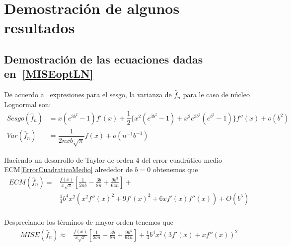\section{Demostración de algunos resultados}

\subsection{Demostración de las ecuaciones dadas en~\eqref{MISEoptLN}}
\begin{dem}
	De acuerdo a~\cite{Libnegue2013} expresiones para el sesgo, la varianza de $\widehat{f}_n$ para le caso de núcleo Lognormal son:
	\begin{align}
	Sesgo(\widehat{f}_n)&=x(e^{3 b^2}-1) f'(x)+\dfrac{1}{2}\{x^2(e^{3 b^2}-1)+x^2 e^{3b^2}(e^{b^2}-1)\}f''(x)+o(b^2)\\
	Var(\widehat{f}_n)&=\dfrac{1}{2 n x b \sqrt{\pi}} f(x)+o(n^{-1}b^{-1})
	\end{align}
	
	Haciendo un desarrollo de Taylor de orden 4 del error cuadrático medio ECM\eqref{ErrorCuadraticoMedio} alrededor de $b=0$ obtenemos que
	\begin{align}
	ECM(\widehat{f}_n)=&\frac{f(x)}{x \sqrt{\pi}}\left[\frac{1}{2 n b}-\frac{3 b}{8 n}+\frac{9 b^3}{64 n}\right]+\\
	                  &\frac{1}{4} b^4 x^2 \left(x^2 f''(x)^2+9 f'(x)^2+6 x f'(x) f''(x)\right)+O\left(b^5\right)\\
	\end{align}
	
	Despreciando los términos de mayor orden tenemos que
	\begin{align}
	MISE(\widehat{f}_n)\approx&\frac{f(x)}{x \sqrt{\pi}}\left[\frac{1}{2 b n}-\frac{3 b}{8 n}+\frac{9 b^3}{64 n}\right]+\frac{1}{4} b^4 x^2\left(3f'(x)+xf''(x)\right)^2
	\end{align}
	 
	
	
\end{dem}



